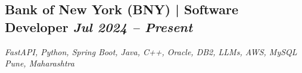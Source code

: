 \documentclass[a4paper,10pt]{article}
\newcommand{\subtext}[1]{
#1\par\vspace{-0.2cm}}
\newenvironment{zitemize}{
\begin{itemize}\itemsep0pt \parskip0pt \parsep1pt}
{\end{itemize}\vspace{-0.7cm}}
\begin{document}
\subsection*{Bank of New York (BNY) | Software Developer \hfill {\small\textit{Jul 2024 – Present}}}
\subtext{\textit{FastAPI, Python, Spring Boot, Java, C++, Oracle, DB2, LLMs, AWS, MySQL} \hfill \textit{Pune, Maharashtra}}
\begin{zitemize}




\end{zitemize}
\end{document}
